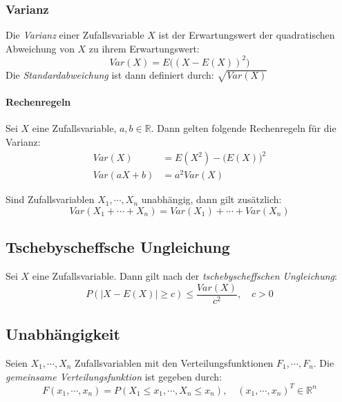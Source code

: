 \documentclass[a4paper, 11pt, accentcolor = tud3b]{tudreport}
\newcommand{\abs}[1]{\ensuremath{{\lvert #1 \rvert}}}
\newcommand{\R}{\ensuremath{\mathbb{R}}}
\newcommand{\Var}{\ensuremath{\textit{Var}}}
\begin{document}
                \subsubsection{Varianz}
                    Die \textit{Varianz} einer Zufallsvariable \(X\) ist der Erwartungswert der quadratischen Abweichung von \(X\) zu ihrem Erwartungswert:
                    \begin{equation*}
	                    \Var(X) = E\big( (X - E(X)) ^ 2 \big)
                    \end{equation*}
                    Die \textit{Standardabweichung} ist dann definiert durch: \( \sqrt{\Var(X)} \)

                    \paragraph{Rechenregeln}
                        Sei \(X\) eine Zufallsvariable, \( a, b \in \R \). Dann gelten folgende Rechenregeln für die Varianz:
                        \begin{align*}
	                        \Var(X) & = E(X^2) - \big(E(X)\big)^2 \\
	                        \Var(aX + b) & = a^2 \Var(X)
                        \end{align*}
                        
	                    Sind Zufallsvariablen \( X_1, \cdots, X_n \) unabhängig, dann gilt zusätzlich:
	                    \begin{equation*}
		                    \Var(X_1 + \cdots + X_n) = \Var(X_1) + \cdots + \Var(X_n)
	                    \end{equation*}

            \subsection{Tschebyscheffsche Ungleichung}
                Sei \( X \) eine Zufallsvariable. Dann gilt nach der \textit{tschebyscheffschen Ungleichung}:
                \begin{equation*}
	                P(\abs{X - E(X)} \geq c) \leq \frac{\Var(X)}{c^2}, \quad c > 0
                \end{equation*}

            \subsection{Unabhängigkeit}
                Seien \( X_1, \cdots, X_n \) Zufallsvariablen mit den Verteilungsfunktionen \( F_1, \cdots, F_n \). Die \textit{gemeinsame Verteilungsfunktion} ist gegeben durch:
                \begin{equation*}
	                F(x_1, \cdots, x_n) = P(X_1 \leq x_1, \cdots, X_n \leq x_n), \quad (x_1, \cdots, x_n)^T \in \R^n
                \end{equation*}
                
\end{document}
